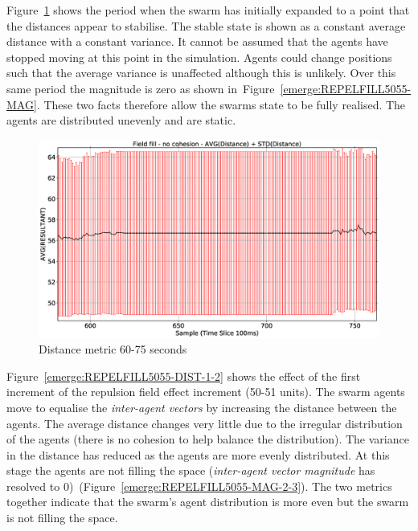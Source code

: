 Figure~\ref{emerge:REPELFILL5055-DIST-1} shows the period when the swarm has initially expanded to a point that the distances appear to stabilise. The stable state is shown as a constant average distance with a constant variance. It cannot be assumed that the agents have stopped moving at this point in the simulation. Agents could change positions such that the average variance is unaffected although this is unlikely. Over this same period the magnitude is zero as shown in~Figure~\ref{emerge:REPELFILL5055-MAG}. These two facts therefore allow the swarms state to be fully realised. The agents are distributed unevenly and are static.

\begin{figure}[H]
\begin{center}
\includegraphics[width=12cm]{CHAPTER-8/figures/REPELFILL5055-DIST-1}
\end{center}
\caption{Distance metric 60-75 seconds\label{emerge:REPELFILL5055-DIST-1}}
\end{figure}

Figure~\ref{emerge:REPELFILL5055-DIST-1-2} shows the effect of the first increment of the repulsion field effect increment (50-51 units). The swarm agents move to equalise the \textit{inter-agent vectors} by increasing the distance between the agents. The average distance changes very little due to the irregular distribution of the agents (there is no cohesion to help balance the distribution). The variance in the distance has reduced as the agents are more evenly distributed. At this stage the agents are not filling the space (\textit{inter-agent vector magnitude} has resolved to 0)~(Figure~\ref{emerge:REPELFILL5055-MAG-2-3}). The two metrics together indicate that the swarm's agent distribution is more even but the swarm is not filling the space.

